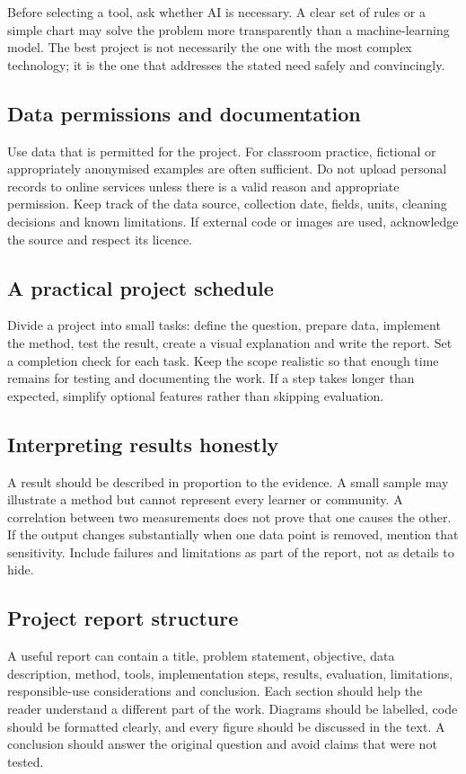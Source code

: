 \documentclass[11pt,openany,oneside]{book}
\begin{document}
Before selecting a tool, ask whether AI is necessary. A clear set of rules or a simple chart may solve the problem more transparently than a machine-learning model. The best project is not necessarily the one with the most complex technology; it is the one that addresses the stated need safely and convincingly.

\subsection{Data permissions and documentation}
Use data that is permitted for the project. For classroom practice, fictional or appropriately anonymised examples are often sufficient. Do not upload personal records to online services unless there is a valid reason and appropriate permission. Keep track of the data source, collection date, fields, units, cleaning decisions and known limitations. If external code or images are used, acknowledge the source and respect its licence.

\subsection{A practical project schedule}
Divide a project into small tasks: define the question, prepare data, implement the method, test the result, create a visual explanation and write the report. Set a completion check for each task. Keep the scope realistic so that enough time remains for testing and documenting the work. If a step takes longer than expected, simplify optional features rather than skipping evaluation.

\subsection{Interpreting results honestly}
A result should be described in proportion to the evidence. A small sample may illustrate a method but cannot represent every learner or community. A correlation between two measurements does not prove that one causes the other. If the output changes substantially when one data point is removed, mention that sensitivity. Include failures and limitations as part of the report, not as details to hide.

\subsection{Project report structure}
A useful report can contain a title, problem statement, objective, data description, method, tools, implementation steps, results, evaluation, limitations, responsible-use considerations and conclusion. Each section should help the reader understand a different part of the work. Diagrams should be labelled, code should be formatted clearly, and every figure should be discussed in the text. A conclusion should answer the original question and avoid claims that were not tested.
\end{document}
